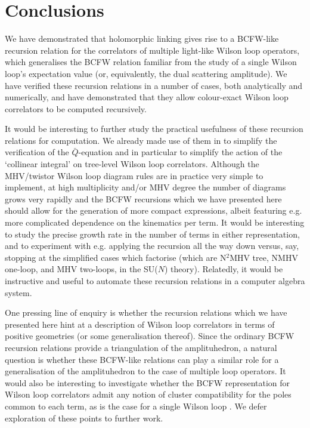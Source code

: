 \documentclass[12pt]{article}
\numberwithin{equation}{section}
\begin{document}
\section{Conclusions}
We have demonstrated that holomorphic linking gives rise to a BCFW-like recursion relation for the correlators of multiple light-like Wilson loop operators, which generalises the BCFW relation familiar from the study of a single Wilson loop's expectation value (or, equivalently, the dual scattering amplitude). We have verified these recursion relations in a number of cases, both analytically and numerically, and have demonstrated that they allow colour-exact Wilson loop correlators to be computed recursively. 

It would be interesting to further study the practical usefulness of these recursion relations for computation. We already made use of them in \cite{Drummond:2026lvq} to simplify the verification of the \(\bar{Q}\)-equation and in particular to simplify the action of the `collinear integral' on tree-level Wilson loop correlators. Although the MHV/twistor Wilson loop diagram rules are in practice very simple to implement, at high multiplicity and/or MHV degree the number of diagrams grows very rapidly and the BCFW recursions which we have presented here should allow for the generation of more compact expressions, albeit featuring e.g. more complicated dependence on the kinematics per term. It would be interesting to study the precise growth rate in the number of terms in either representation, and to experiment with e.g. applying the recursion all the way down versus, say, stopping at the simplified cases which factorise (which are N\(^2\)MHV tree, NMHV one-loop, and MHV two-loops, in the SU($N$) theory). Relatedly, it would be instructive and useful to automate these recursion relations in a computer algebra system. 

One pressing line of enquiry is whether the recursion relations which we have presented here hint at a description of Wilson loop correlators in terms of positive geometries (or some generalisation thereof). Since the ordinary BCFW recursion relations provide a triangulation of the amplituhedron, a natural question is whether these BCFW-like relations can play a similar role for a generalisation of the amplituhedron to the case of multiple loop operators. It would also be interesting to investigate whether the BCFW representation for Wilson loop correlators admit any notion of cluster compatibility for the poles common to each term, as is the case for a single Wilson loop \cite{Drummond:2018dfd}. We defer exploration of these points to further work. 
\end{document}

